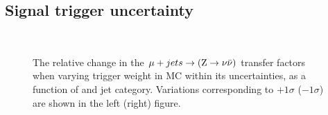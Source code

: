 \clearpage
\subsection{Signal trigger uncertainty}

\begin{figure}[!h]
  \centering
   ~~
  \\

  \caption{\label{fig:tfSyst_trigger_muToZinv} The relative change in
  the $\mj \rightarrow (\znunu)$ transfer
  factors when varying trigger weight in MC within its uncertainties, as a function of \scalht and jet category. 
  Variations corresponding to $+1\sigma$ ($-1\sigma$) are shown in the left (right) figure. 
  }
\end{figure}
